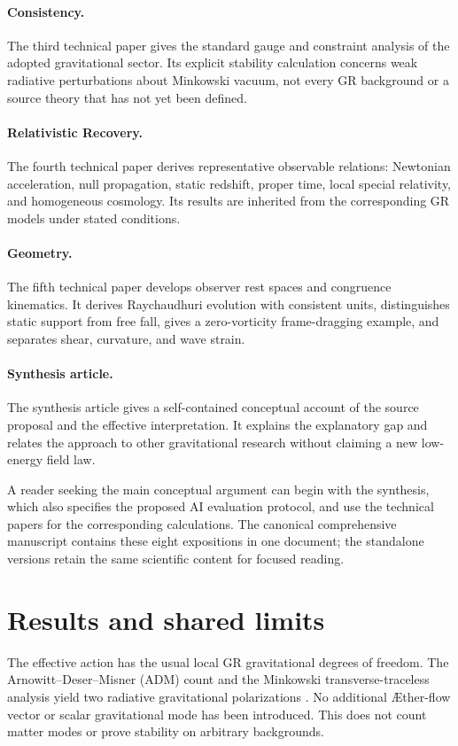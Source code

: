 \documentclass[11pt,oneside]{report}
\newcommand{\Aflow}{\AE{}ther-flow}
\theoremstyle{remark}
\numberwithin{definition}{chapter}
\numberwithin{proposition}{chapter}
\numberwithin{remark}{chapter}
\begin{document}
\paragraph{Consistency.} The third technical paper gives the standard gauge and constraint analysis of the adopted gravitational sector. Its explicit stability calculation concerns weak radiative perturbations about Minkowski vacuum, not every GR background or a source theory that has not yet been defined.

\paragraph{Relativistic Recovery.} The fourth technical paper derives representative observable relations: Newtonian acceleration, null propagation, static redshift, proper time, local special relativity, and homogeneous cosmology. Its results are inherited from the corresponding GR models under stated conditions.

\paragraph{Geometry.} The fifth technical paper develops observer rest spaces and congruence kinematics. It derives Raychaudhuri evolution with consistent units, distinguishes static support from free fall, gives a zero-vorticity frame-dragging example, and separates shear, curvature, and wave strain.

\paragraph{Synthesis article.} The synthesis article gives a self-contained conceptual account of the source proposal and the effective interpretation. It explains the explanatory gap and relates the approach to other gravitational research without claiming a new low-energy field law.

A reader seeking the main conceptual argument can begin with the synthesis, which also specifies the proposed AI evaluation protocol, and use the technical papers for the corresponding calculations. The canonical comprehensive manuscript contains these eight expositions in one document; the standalone versions retain the same scientific content for focused reading.

\section{Results and shared limits}
The effective action has the usual local GR gravitational degrees of freedom. The Arnowitt--Deser--Misner (ADM) count and the Minkowski transverse-traceless analysis yield two radiative gravitational polarizations \parencite{ADM1962}. No additional \Aflow{} vector or scalar gravitational mode has been introduced. This does not count matter modes or prove stability on arbitrary backgrounds.
\end{document}
